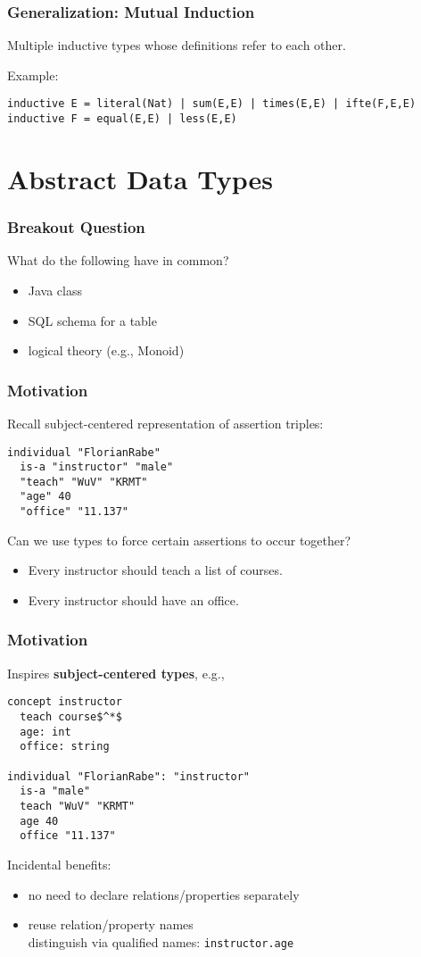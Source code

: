 \begin{frame}[fragile]\frametitle{Generalization: Mutual Induction}
Multiple inductive types whose definitions refer to each other.

Example:
\begin{lstlisting}
inductive E = literal(Nat) | sum(E,E) | times(E,E) | ifte(F,E,E)
inductive F = equal(E,E) | less(E,E)
\end{lstlisting}
\end{frame}

\section{Abstract Data Types}

\begin{frame}\frametitle{Breakout Question}
What do the following have in common?
\begin{itemize}
\item Java class
\item SQL schema for a table
\item logical theory (e.g., Monoid)
\end{itemize}
\end{frame}

\begin{frame}[fragile]\frametitle{Motivation}
Recall subject-centered representation of assertion triples:

\begin{lstlisting}
individual "FlorianRabe"
  is-a "instructor" "male"
  "teach" "WuV" "KRMT"
  "age" 40
  "office" "11.137"
\end{lstlisting}

Can we use types to force certain assertions to occur together?
\begin{itemize}
\item Every instructor should teach a list of courses.
\item Every instructor should have an office.
\end{itemize}
\end{frame}

\begin{frame}[fragile]\frametitle{Motivation}
Inspires \textbf{subject-centered types}, e.g.,

\begin{lstlisting}
concept instructor
  teach course$^*$
  age: int
  office: string

individual "FlorianRabe": "instructor"
  is-a "male"
  teach "WuV" "KRMT"
  age 40
  office "11.137"
\end{lstlisting}

Incidental benefits:
\begin{itemize}
\item no need to declare relations/properties separately
\item reuse relation/property names \\ distinguish via qualified names: \lstinline|instructor.age|
\end{itemize}
\end{frame}

